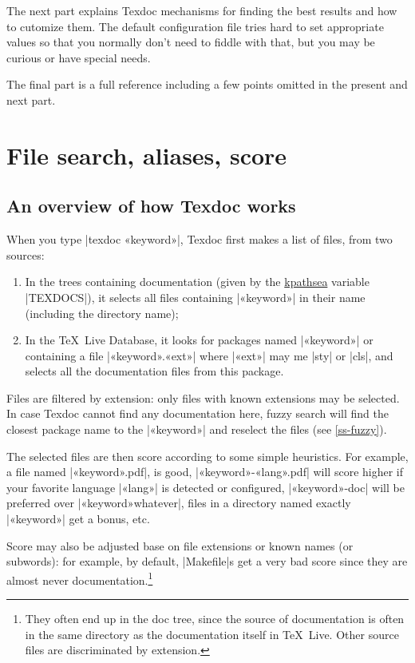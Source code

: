 \documentclass[a4paper, oneside]{scrartcl}
\newcommand\texlive{\TeX~Live\xspace}
\begin{document}
The next part explains Texdoc mechanisms for finding the best results and how
to cutomize them. The default configuration file tries hard to set appropriate
values so that you normally don't need to fiddle with that, but you may be
curious or have special needs.

The final part is a full reference including a few points omitted in the
present and next part.

\clearpage

\section{File search, aliases, score}

\subsection{An overview of how Texdoc works}

When you type |texdoc «keyword»|, Texdoc first makes a list of files, from two
sources:
\begin{enumerate}
  \item In the trees containing documentation (given by the
    \href{https://www.tug.org/kpathsea/} {kpathsea} variable |TEXDOCS|), it
    selects all files containing |«keyword»| in their name (including the
    directory name);
  \item In the \texlive Database, it looks for packages named
    |«keyword»| or containing a file |«keyword».«ext»| where |«ext»| may me
    |sty| or |cls|, and selects all the documentation files from this package.
\end{enumerate}
Files are filtered by extension: only files with known extensions may be
selected. In case Texdoc cannot find any documentation here, fuzzy search will
find the closest package name to the |«keyword»| and reselect the files (see
\ref{ss-fuzzy}).

The selected files are then score according to some simple heuristics.  For
example, a file named |«keyword».pdf|, is good, |«keyword»-«lang».pdf| will
score higher if your favorite language |«lang»| is detected or configured,
|«keyword»-doc| will be preferred over |«keyword»whatever|, files in a
directory named exactly |«keyword»| get a bonus, etc.

Score may also be adjusted base on file extensions or known names (or
subwords): for example, by default, |Makefile|s get a very bad score since
they are almost never documentation.\footnote{They often end up in the doc
  tree, since the source of documentation is often in the same directory as
  the documentation itself in \texlive. Other source files are discriminated
  by extension.}
\end{document}
